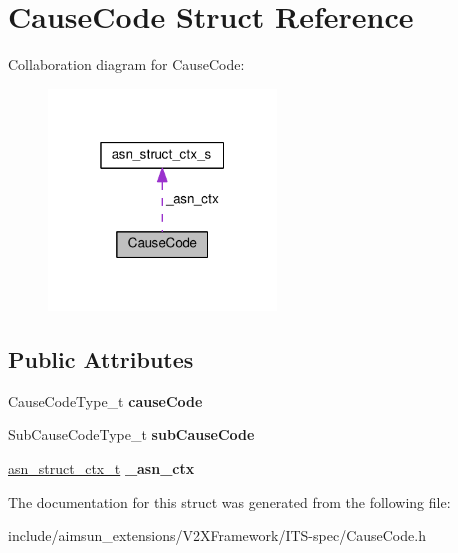 \hypertarget{structCauseCode}{}\section{Cause\+Code Struct Reference}
\label{structCauseCode}


Collaboration diagram for Cause\+Code\+:\nopagebreak
\begin{figure}[H]
\begin{center}
\leavevmode
\includegraphics[width=172pt]{structCauseCode__coll__graph}
\end{center}
\end{figure}
\subsection*{Public Attributes}
\begin{DoxyCompactItemize}
\item 
Cause\+Code\+Type\+\_\+t {\bfseries cause\+Code}\hypertarget{structCauseCode_acb66d21175aa9a9ebf439c7a83d0832d}{}\label{structCauseCode_acb66d21175aa9a9ebf439c7a83d0832d}

\item 
Sub\+Cause\+Code\+Type\+\_\+t {\bfseries sub\+Cause\+Code}\hypertarget{structCauseCode_afc5fdd06b09bc244a6f5e8c2034f24ff}{}\label{structCauseCode_afc5fdd06b09bc244a6f5e8c2034f24ff}

\item 
\hyperlink{structasn__struct__ctx__s}{asn\+\_\+struct\+\_\+ctx\+\_\+t} {\bfseries \+\_\+asn\+\_\+ctx}\hypertarget{structCauseCode_a6d154f1bd07ba07f0904218aacc18762}{}\label{structCauseCode_a6d154f1bd07ba07f0904218aacc18762}

\end{DoxyCompactItemize}


The documentation for this struct was generated from the following file\+:\begin{DoxyCompactItemize}
\item 
include/aimsun\+\_\+extensions/\+V2\+X\+Framework/\+I\+T\+S-\/spec/Cause\+Code.\+h\end{DoxyCompactItemize}
